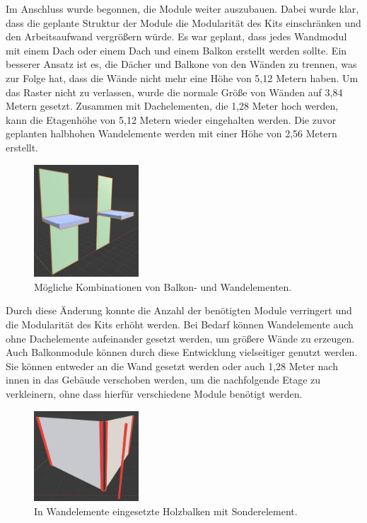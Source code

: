 Im Anschluss wurde begonnen, die Module weiter auszubauen. Dabei wurde klar, dass die geplante Struktur der Module die Modularität des Kits einschränken und den Arbeitsaufwand vergrößern würde. Es war geplant, dass jedes Wandmodul mit einem Dach oder einem Dach und einem Balkon erstellt werden sollte. Ein besserer Ansatz ist es, die Dächer und Balkone von den Wänden zu trennen, was zur Folge hat, dass die Wände nicht mehr eine Höhe von 5,12 Metern haben. Um das Raster nicht zu verlassen, wurde die normale Größe von Wänden auf 3,84 Metern gesetzt. Zusammen mit Dachelementen, die 1,28 Meter hoch werden, kann die Etagenhöhe von 5,12 Metern wieder eingehalten werden. Die zuvor geplanten halbhohen Wandelemente werden mit einer Höhe von 2,56 Metern erstellt. 
\newpage
\begin{figure}
\centering 
  \vspace{-0.5pt}
    \includegraphics[width=0.35\textwidth]{bilder/balconposition}
      \caption{Mögliche Kombinationen von Balkon- und Wandelementen.}\label{balconposition}
      \vspace{-14pt}
\end{figure}
Durch diese Änderung konnte die Anzahl der benötigten Module verringert und die Modularität des Kits erhöht werden. Bei Bedarf können Wandelemente auch ohne Dachelemente aufeinander gesetzt werden, um größere Wände zu erzeugen. Auch Balkonmodule können durch diese Entwicklung vielseitiger genutzt werden. Sie können entweder an die Wand gesetzt werden oder auch 1,28 Meter nach innen in das Gebäude verschoben werden, um die nachfolgende Etage zu verkleinern, ohne dass hierfür verschiedene Module benötigt werden.
\par
\begin{figure}
\centering 
  \vspace{-11.5pt}
    \includegraphics[width=0.35\textwidth]{bilder/holzecke}
      \caption{In Wandelemente eingesetzte Holzbalken mit Sonderelement.}\label{holzecke}
      \vspace{-14pt}
\end{figure}
